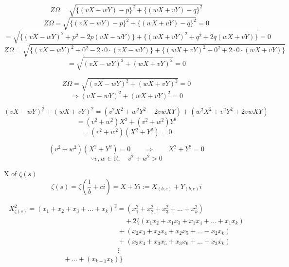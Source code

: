 \documentclass{amsart}
\begin{document}
	\[ Z\Omega = \sqrt{\{(vX-wY)-p\}^2 + \{(wX+vY)-q\}^2} \]
	\[ Z\Omega = \sqrt{\{(vX-wY)-p\}^2 + \{(wX+vY)-q\}^2} = 0 \]
	\[ = \sqrt{\{ (vX-wY)^2 {+} p^2 -2p(vX-wY) \} {+} \{ (wX{+}vY)^2 {+} q^2 {+} 2q(wX{+}vY) \}} = 0 \]
	\[ Z\Omega = \sqrt{\{ (vX-wY)^2 {+} 0^2 -2 \cdot 0 \cdot (vX-wY) \} {+} \{ (wX{+}vY)^2 {+} 0^2 {+} 2 \cdot 0 \cdot (wX{+}vY) \}} \]
	\[ = \sqrt{(vX-wY)^2 {+} (wX{+}vY)^2} = 0 \]
	
	\[ Z\Omega =  \sqrt{(vX-wY)^2 + (wX+vY)^2} = 0 \]
	\[ \Rightarrow (vX-wY)^2 + (wX+vY)^2 = 0 \]
	
	\[ (vX-wY)^2 + (wX+vY)^2 = (v^2X^2 + w^2Y^2 - 2vwXY) + (w^2X^2 + v^2Y^2 + 2vwXY) \]
	\[ = (v^2 + w^2)X^2 + (v^2 + w^2)Y^2 \]
	\[ = (v^2 + w^2)(X^2+Y^2) = 0 \]
	
	\[ (v^2 + w^2)(X^2+Y^2) = 0 \qquad \Rightarrow \qquad X^2+Y^2 = 0 \]
	\[ \because v, w \in \mathbb{R}, \quad v^2 + w^2 > 0 \]
	
	
	\newpage
	X of $\zeta(s)$
	\[ \zeta(s) = \zeta(\frac{1}{b}+ci) = X+Yi := X_{(b,c)} + Y_{(b,c)}i \]
	
	\[ \begin{array}{c}
		X_{\zeta(s)}^2 = (x_1 + x_2 + x_3 + \dots + x_k)^2 = (x_1^2 + x_2^2 + x_3^2 + \dots + x_k^2) \\
		\qquad\qquad\qquad\qquad\qquad\qquad\qquad\qquad\quad + 2\{(x_1x_2 + x_1x_3 + x_1x_4 + \dots + x_{1}x_{k}) \\ 
		\qquad\qquad\qquad\qquad\qquad\qquad\qquad\qquad + (x_2x_3 + x_2x_4 + x_2x_5 + \dots + x_2x_{k}) \\ 
		\qquad\qquad\qquad\qquad\qquad\qquad\qquad\qquad + (x_3x_4 + x_3x_5 + x_3x_6 + \dots + x_3x_{k}) \\ 
		\qquad\qquad\qquad\qquad\qquad\qquad\qquad\qquad \vdots \\
		\qquad\qquad\qquad\qquad + \dots + (x_{k-1}x_{k}) \} \\ 
	\end{array} \]
	\[\]
	
\end{document}
